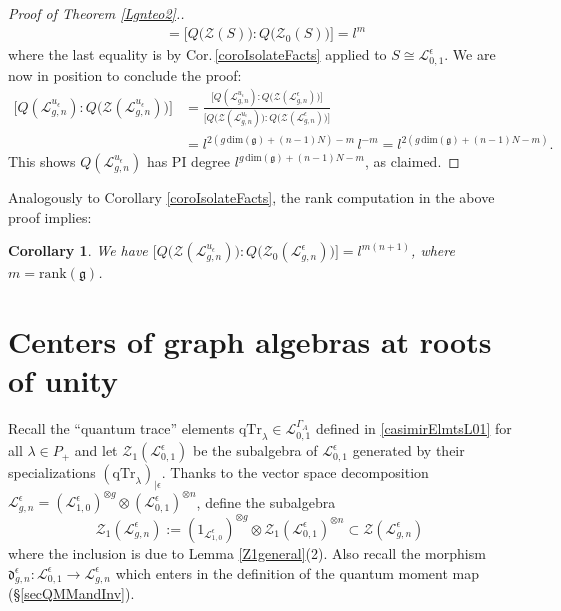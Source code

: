 \documentclass[11pt]{amsart}
\newtheorem{cor}[teo]{Corollary}
\newcommand{\e}{\epsilon}
\newcommand{\Ll}{\mathcal{L}}
\begin{document}
\begin{proof}[Proof of Theorem \ref{Lgnteo2}.]
\begin{align*}
&= \bigl[ Q\bigl(\mathcal{Z}(S)\bigr) : Q\bigl(\mathcal{Z}_0(S)\bigr) \bigr] = l^m
\end{align*}
where the last equality is by Cor.\,\ref{coroIsolateFacts} applied to $S \cong \mathcal{L}_{0,1}^\e$. We are now in position to conclude the proof:
\begin{align*}
\bigl[ Q(\Ll_{g,n}^{u_\e}) : Q\bigl( \mathcal{Z}(\Ll_{g,n}^{u_\e}) \bigr)  \bigr] & = \frac{\bigl[ Q(\Ll_{g,n}^{u_\e}) : Q\bigl( \mathcal{Z}(\Ll_{g,n}^{\e}) \bigr) \bigr]}{\bigl[ Q\bigl( \mathcal{Z}(\Ll_{g,n}^{u_\e}) \bigr) : Q\bigl( \mathcal{Z}(\Ll_{g,n}^{\e}) \bigr) \bigr]} \\
& = l^{2(g\,\mathrm{dim}(\mathfrak{g})+(n-1)N)-m}\,l^{-m} = l^{2(g\,\mathrm{dim}(\mathfrak{g})+(n-1)N-m)}. 
\end{align*}
This shows $Q(\Ll_{g,n}^{u_\e})$ has PI degree $l^{g\,\mathrm{dim}(\mathfrak{g})+(n-1)N-m}$, as claimed.
\end{proof}
Analogously to Corollary \ref{coroIsolateFacts}, the rank computation in the above proof implies:
\begin{cor}\label{rkjanv26} We have $\bigl[ Q\bigl(\mathcal{Z}(\Ll_{g,n}^{u_\e})\bigr):Q\bigl(\mathcal{Z}_0(\Ll_{g,n}^{\e})\bigr) \bigr] = l^{m(n+1)}$, where $m = \mathrm{rank}(\mathfrak{g})$.
\end{cor}


\section{Centers of graph algebras at roots of unity} \label{sec:proofLgn3} 
Recall the ``quantum trace'' elements $\mathrm{qTr}_\lambda \in \mathcal{L}_{0,1}^{\Gamma_A}$ defined in \eqref{casimirElmtsL01} for all $\lambda \in P_+$ and let $\mathcal{Z}_1(\mathcal{L}_{0,1}^\e)$ be the subalgebra of $\mathcal{L}_{0,1}^\e$ generated by their specializations $(\mathrm{qTr}_\lambda)_{|\e}$. Thanks to the vector space decomposition $\mathcal{L}_{g,n}^{\e} = (\mathcal{L}_{1,0}^{\e})^{\otimes g} \otimes (\mathcal{L}_{0,1}^{\e})^{\otimes n}$, define the subalgebra
\begin{equation}\label{defZ1Lgn}
\mathcal{Z}_1(\mathcal{L}_{g,n}^{\e}) := (1_{\mathcal{L}_{1,0}^{\e}})^{\otimes g} \otimes \mathcal{Z}_1(\mathcal{L}_{0,1}^{\e})^{\otimes n} \subset \mathcal{Z}(\mathcal{L}_{g,n}^{\e})
\end{equation}
where the inclusion is due to Lemma \ref{Z1general}(2). Also recall the morphism $\mathfrak{d}_{g,n}^{\e} : \Ll_{0,1}^\e \to \Ll_{g,n}^{\e}$ which enters in the definition of the quantum moment map (\S\ref{secQMMandInv}).
\smallskip
\end{document}
